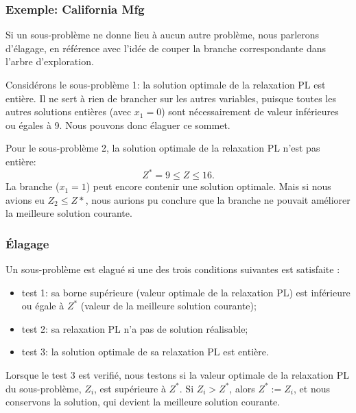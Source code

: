 \documentclass[usepdftitle=false]{beamer}
\begin{document}
\begin{frame}
\frametitle{Exemple: California Mfg}

Si un sous-problème ne donne lieu à aucun autre problème, nous parlerons d'élagage, en référence avec l'idée de couper la branche correspondante dans l'arbre d'exploration.

\mbox{}

Considérons le sous-problème 1: la solution optimale de la relaxation PL est entière.
Il ne sert à rien de brancher sur les autres variables, puisque toutes les autres solutions entières (avec $x_1 = 0$) sont nécessairement de valeur inférieures ou égales à 9.
Nous pouvons donc élaguer ce sommet.

\mbox{}

Pour le sous-problème 2, la solution optimale de la relaxation PL n'est pas entière:
\[
Z^* = 9 \leq Z \leq 16.
\]
La branche ($x_1 = 1$) peut encore contenir une solution optimale.
Mais si nous avions eu $Z_2 \leq Z*$, nous aurions pu conclure que la
branche ne pouvait améliorer la meilleure solution courante.

\end{frame}

\begin{frame}
\frametitle{Élagage}

Un sous-problème est elagué si une des trois conditions suivantes est satisfaite :
\begin{itemize}
\item
test 1: sa borne supérieure (valeur optimale de la relaxation PL) est inférieure ou égale à $Z^*$ (valeur de la meilleure solution courante);
\item
test 2: sa relaxation PL n'a pas de solution réalisable;
\item
test 3: la solution optimale de sa relaxation PL est entière.
\end{itemize}
Lorsque le test 3 est verifié, nous testons si la valeur optimale de la relaxation PL du sous-problème, $Z_i$, est supérieure à $Z^*$.
Si $Z_i > Z^*$, alors $Z^* := Z_i$, et nous conservons la solution, qui
devient la meilleure solution courante.

\end{frame}
\end{document}
